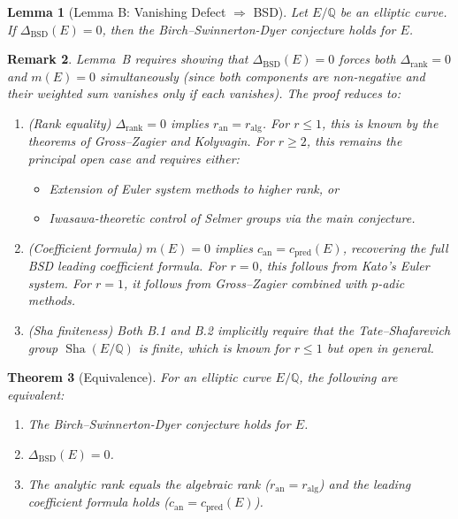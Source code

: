 \documentclass[11pt]{article}
\newtheorem{theorem}{Theorem}[section]
\newtheorem{lemma}[theorem]{Lemma}
\newtheorem{remark}[theorem]{Remark}
\DeclareMathOperator{\Sha}{Sha}
\begin{document}
\begin{lemma}[Lemma B: Vanishing Defect $\Rightarrow$ BSD]
\label{lem:bsd-B}
Let $E/\mathbb{Q}$ be an elliptic curve. If $\Delta_{\mathrm{BSD}}(E) = 0$, then the Birch--Swinnerton-Dyer conjecture holds for $E$.
\end{lemma}

\begin{remark}
Lemma~B requires showing that $\Delta_{\mathrm{BSD}}(E) = 0$ forces both $\Delta_{\mathrm{rank}} = 0$ and $m(E) = 0$ simultaneously (since both components are non-negative and their weighted sum vanishes only if each vanishes). The proof reduces to:
\begin{enumerate}
  \item[\textbf{B.1}] \emph{(Rank equality)} $\Delta_{\mathrm{rank}} = 0$ implies $r_{\mathrm{an}} = r_{\mathrm{alg}}$. For $r \leq 1$, this is known by the theorems of Gross--Zagier and Kolyvagin. For $r \geq 2$, this remains the principal open case and requires either:
    \begin{itemize}
      \item Extension of Euler system methods to higher rank, or
      \item Iwasawa-theoretic control of Selmer groups via the main conjecture.
    \end{itemize}
  \item[\textbf{B.2}] \emph{(Coefficient formula)} $m(E) = 0$ implies $c_{\mathrm{an}} = c_{\mathrm{pred}}(E)$, recovering the full BSD leading coefficient formula. For $r = 0$, this follows from Kato's Euler system. For $r = 1$, it follows from Gross--Zagier combined with $p$-adic methods.
  \item[\textbf{B.3}] \emph{(Sha finiteness)} Both B.1 and B.2 implicitly require that the Tate--Shafarevich group $\Sha(E/\mathbb{Q})$ is finite, which is known for $r \leq 1$ but open in general.
\end{enumerate}
\end{remark}

\begin{theorem}[Equivalence]
\label{thm:bsd-equiv}
For an elliptic curve $E/\mathbb{Q}$, the following are equivalent:
\begin{enumerate}
  \item[(i)] The Birch--Swinnerton-Dyer conjecture holds for $E$.
  \item[(ii)] $\Delta_{\mathrm{BSD}}(E) = 0$.
  \item[(iii)] The analytic rank equals the algebraic rank ($r_{\mathrm{an}} = r_{\mathrm{alg}}$) and the leading coefficient formula holds ($c_{\mathrm{an}} = c_{\mathrm{pred}}(E)$).
\end{enumerate}
\end{theorem}
\end{document}
